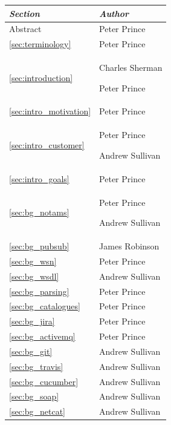 \documentclass[a4paper, 12pt, twoside]{article}
\newcommand*{\fullref}[1]{\ref{#1} \nameref{#1}}
\begin{document}
\begin{tabularx}{\textwidth}{|X|X|} \hline
  \emph{Section}                         & \emph{Author}                      \\ \hline
  Abstract                               & Peter Prince                       \\ \hline
  \fullref{sec:terminology}              & Peter Prince                       \\ \hline
  \fullref{sec:introduction}             & Charles Sherman\par Peter Prince   \\ \hline
  \fullref{sec:intro_motivation}         & Peter Prince                       \\
  \fullref{sec:intro_customer}           & Peter Prince\par Andrew Sullivan   \\
  \fullref{sec:intro_goals}              & Peter Prince                       \\ \hline
  \fullref{sec:bg_notams}                & Peter Prince\par Andrew Sullivan   \\
  \fullref{sec:bg_pubsub}                & James Robinson                     \\
  \fullref{sec:bg_wsn}                   & Peter Prince                       \\
  \fullref{sec:bg_wsdl}                  & Andrew Sullivan                    \\
  \fullref{sec:bg_parsing}               & Peter Prince                       \\
  \fullref{sec:bg_catalogues}            & Peter Prince                       \\
  \fullref{sec:bg_jira}                  & Peter Prince                       \\
  \fullref{sec:bg_activemq}              & Peter Prince                       \\
  \fullref{sec:bg_git}                   & Andrew Sullivan                    \\
  \fullref{sec:bg_travis}                & Andrew Sullivan                    \\
  \fullref{sec:bg_cucumber}              & Andrew Sullivan                    \\
  \fullref{sec:bg_soap}                  & Andrew Sullivan                    \\
  \fullref{sec:bg_netcat}                & Andrew Sullivan                    \\

\end{tabularx}
\end{document}
